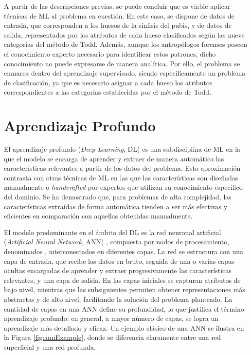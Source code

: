 A partir de las descripciones previas, se puede concluir que es viable aplicar técnicas de ML al problema en cuestión. En este caso, se dispone de datos de entrada, que corresponden a los huesos de la sínfisis del pubis, y de datos de salida, representados por los atributos de cada hueso clasificados según las nueve categorías del método de Todd. Además, aunque los antropólogos forenses poseen el conocimiento experto necesario para identificar estos patrones, dicho conocimiento no puede expresarse de manera analítica. Por ello, el problema se enmarca dentro del aprendizaje supervisado, siendo específicamente un problema de clasificación, ya que es necesario asignar a cada hueso los atributos correspondientes a las categorías establecidas por el método de Todd.

\section{Aprendizaje Profundo}
\label{section2:DL}
El aprendizaje profundo (\textit{Deep Learning}, DL) \cite{Goodfellow-et-al-2016, bishop_deep_2024, prince_understanding_2023, lecun_deep_2015, schmidhuber_deep_2015} es una subdisciplina de ML en la que el modelo se encarga de aprender y extraer de manera automática las características relevantes a partir de los datos del problema. Esta aproximación contrasta con otras técnicas de ML en las que las características son diseñadas manualmente o \textit{handcrafted} por expertos que utilizan su conocimiento específico del dominio. Se ha demostrado que, para problemas de alta complejidad, las características extraídas de forma automática tienden a ser más efectivas y eficientes en comparación con aquellas obtenidas manualmente.

El modelo predominante en el ámbito del DL es la red neuronal artificial (\textit{Artificial Neural Network}, ANN) \cite{bishop_ANN, ripley_ANN}, compuesta por nodos de procesamiento, denominados , interconectados en diferentes capas. La red se estructura con una capa de entrada, que recibe los datos en bruto, seguida de una o varias capas ocultas encargadas de aprender y extraer progresivamente las características relevantes, y una capa de salida. En las capas iniciales se capturan atributos de bajo nivel, mientras que las subsiguientes permiten obtener representaciones más abstractas y de alto nivel, facilitando la solución del problema planteado. La cantidad de capas en una ANN define su profundidad, lo que justifica el término aprendizaje profundo: en general, a mayor número de capas, se logra un aprendizaje más detallado y eficaz. Un ejemplo clásico de una ANN se ilustra en la Figura \ref{fig:annExample}, donde se diferencia claramente entre una red superficial y una red profunda.

